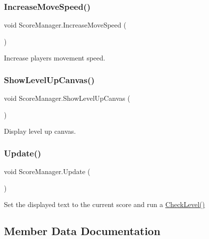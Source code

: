\subsubsection{\texorpdfstring{IncreaseMoveSpeed()}{IncreaseMoveSpeed()}}
{\footnotesize\ttfamily void Score\+Manager.\+Increase\+Move\+Speed (\begin{DoxyParamCaption}{ }\end{DoxyParamCaption})}



Increase player\textquotesingle{}s movement speed. 

\mbox{\label{class_score_manager_ac076b18c0e58bcbb0b4909a26e6a96e1}} 
\subsubsection{\texorpdfstring{ShowLevelUpCanvas()}{ShowLevelUpCanvas()}}
{\footnotesize\ttfamily void Score\+Manager.\+Show\+Level\+Up\+Canvas (\begin{DoxyParamCaption}{ }\end{DoxyParamCaption})\hspace{0.3cm}{\ttfamily [private]}}



Display level up canvas. 

\mbox{\label{class_score_manager_a0d37ca647468e53d1735d8d185b7ee34}} 
\subsubsection{\texorpdfstring{Update()}{Update()}}
{\footnotesize\ttfamily void Score\+Manager.\+Update (\begin{DoxyParamCaption}{ }\end{DoxyParamCaption})\hspace{0.3cm}{\ttfamily [private]}}



Set the displayed text to the current score and run a \mbox{\hyperlink{class_score_manager_ac524ca46a457f5258a2632e979640021}{Check\+Level()}} 



\subsection{Member Data Documentation}
\mbox{\label{class_score_manager_a623170e953f0840f70797d12148dd34f}} 
